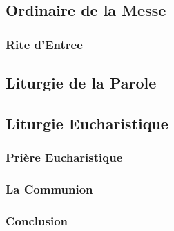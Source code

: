 \begin{french}
\chapter[Ordinaire de la Messe][Ordinaire de la Messe]{Ordinaire de la Messe}
\subsection*{Rite d’Entree}



\section[Liturgie de la Parole]{Liturgie de la Parole}

\section[Liturgie Eucharistique]{Liturgie Eucharistique}


\subsection*{Prière Eucharistique}


\subsection*{La Communion}


\subsection*{Conclusion}

\end{french}

